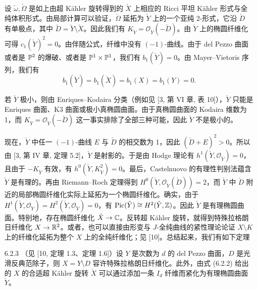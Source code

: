设 $\check\omega,\check\Omega$ 是如上由超 Kähler 旋转得到的 $\check X$ 上相应的 Ricci 平坦 Kähler 形式与全纯体积形式。由局部计算可以验证，$\check\Omega$ 延拓为 $\check Y$ 上的一个亚纯 2-形式，它沿 $\check D$ 有单极点，其中 $\check D=\check Y\setminus\check X$。因此我们有 $K_{\check Y}=\mathcal{O}_{\check Y}(-\check D)$。由 $\check Y$ 上的椭圆纤维化可得 $c_1(\check Y)^2=0$。由伴随公式，纤维中没有 $(-1)$-曲线。由于 del Pezzo 曲面或者是 $\mathbb{P}^2$ 的爆破、或者是 $\mathbb{P}^1\times\mathbb{P}^1$，我们有 $b_1(\check Y)=0$。由 Mayer--Vietoris 序列，我们有
\[
b_1(\check Y)=b_1(\check X)=b_1(X)=b_1(Y)=0.
\]

若 $\check Y$ 极小，则由 Enriques--Kodaira 分类（例如见 [3, 第 VI 章, 表 10]），$\check Y$ 只能是 Enriques 曲面、K3 曲面或极小真椭圆曲面。由于真椭圆曲面的 Kodaira 维数为 1，而 $K_{\check Y}=\mathcal{O}_{\check Y}(-\check D)$ 这一事实排除了全部三种可能，因此 $\check Y$ 不是极小的。

现在，$\check Y$ 中任一 $(-1)$-曲线 $E$ 与 $\check D$ 的相交数为 1，因此 $(\check D+E)^2>0$。所以由 [3, 第 IV 章, 定理 5.2]，$\check Y$ 是射影的。于是由 Hodge 理论有 $h^1(\check Y,\mathcal{O}_{\check Y})=0$，且由于 $-K_{\check Y}$ 有效，有 $h^0(\check Y,K_{\check Y}^2)=0$。最后，Castelnuovo 的有理性判别法蕴含 $\check Y$ 是有理的。再由 Riemann--Roch 定理得到 $H^0(\check Y,\mathcal{O}_{\check Y}(\check D))=2$，而 $\check Y$ 中 $\check D$ 附近的局部椭圆纤维化实际上延拓为一个椭圆纤维化。确实，由于 $H^1(\check Y,\mathcal{O}_{\check Y})=H^2(\check Y,\mathcal{O}_{\check Y})=0$，有 $\operatorname{Pic}(\check Y)\cong H^2(\check Y,\mathbb{Z})$。因此 $\check Y$ 是有理椭圆曲面。特别地，存在椭圆纤维化 $\check X\to\mathbb{C}$。反转超 Kähler 旋转，就得到特殊拉格朗日纤维化 $X\to\mathbb{R}^2$。或者，也可以直接由形变与 $J$-全纯曲线的紧性理论论证 $X\setminus K$ 上的纤维化延拓为整个 $X$ 上的全纯纤维化；见 [10]。总结起来，我们有如下定理

\begin{theorem}{6.2.3}
（见 [10, 定理 1.3、定理 1.6]）设 $Y$ 是次数为 $d$ 的 del Pezzo 曲面，$D$ 是光滑反典范除子，则 $X=Y\setminus D$ 容许特殊拉格朗日纤维化。此外，由式 (6.2.2) 给出的 $X$ 的合适超 Kähler 旋转 $\check X$ 可以通过添加一条 $I_d$ 纤维而紧化为有理椭圆曲面 $\check Y$。
\end{theorem}

